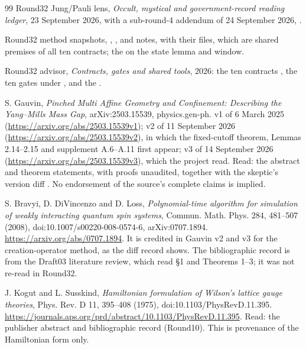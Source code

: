 \begin{thebibliography}{99}
Round32 Jung/Pauli lens,
\emph{Occult, mystical and government-record reading ledger}, 23 September
2026, with a sub-round-4 addendum of 24 September 2026,
.

Round32 method snapshots,
,
,
and
notes, with their  files, which are shared premises of all
ten contracts; the
 on the state lemma and window.

Round32 advisor,
\emph{Contracts, gates and shared tools}, 2026: the ten contracts
, the ten gates
 under ,
and the .

S. Gauvin,
\emph{Pinched Multi Affine Geometry and Confinement: Describing the Yang--Mills
Mass Gap}, arXiv:2503.15539, physics.gen-ph.
v1 of 6 March 2025 (\url{https://arxiv.org/abs/2503.15539v1});
v2 of 11 September 2026 (\url{https://arxiv.org/abs/2503.15539v2}), in which
the fixed-cutoff theorem, Lemmas 2.14--2.15 and supplement A.6--A.11 first
appear; v3 of 14 September 2026
(\url{https://arxiv.org/abs/2503.15539v3}), which the project read.
Read: the abstract and theorem statements, with proofs unaudited, together
with the skeptic's version diff \cite{r32gauvin}. No endorsement of the
source's complete claims is implied.

S. Bravyi, D. DiVincenzo and D. Loss,
\emph{Polynomial-time algorithm for simulation of weakly interacting quantum
spin systems}, Commun. Math. Phys. 284, 481--507 (2008),
doi:10.1007/s00220-008-0574-6, arXiv:0707.1894.
\url{https://arxiv.org/abs/0707.1894}.
It is credited in Gauvin v2 and v3 for the creation-operator method, as the
diff record shows. The bibliographic record is from the Draft03 literature
review, which read \S1 and Theorems 1--3; it was not re-read in Round32.

J. Kogut and L. Susskind,
\emph{Hamiltonian formulation of Wilson's lattice gauge theories},
Phys. Rev. D 11, 395--408 (1975), doi:10.1103/PhysRevD.11.395.
\url{https://journals.aps.org/prd/abstract/10.1103/PhysRevD.11.395}.
Read: the publisher abstract and bibliographic record (Round10). This is
provenance of the Hamiltonian form only.


\end{thebibliography}
